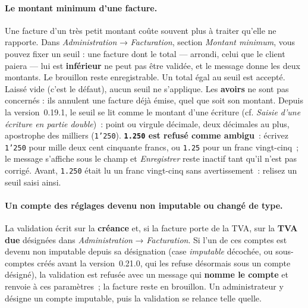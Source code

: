 \documentclass[a4paper,11pt,oneside]{article}
\begin{document}
\paragraph{Le montant minimum d'une facture.} Une facture d'un très petit montant coûte souvent plus à traiter qu'elle ne rapporte. Dans \emph{Administration} → \emph{Facturation}, section \emph{Montant minimum}, vous pouvez fixer un seuil : une facture dont le total --- arrondi, celui que le client paiera --- lui est \textbf{inférieur} ne peut pas être validée, et le message donne les deux montants. Le brouillon reste enregistrable. Un total égal au seuil est accepté. Laissé vide (c'est le défaut), aucun seuil ne s'applique. Les \textbf{avoirs} ne sont pas concernés : ils annulent une facture déjà émise, quel que soit son montant. Depuis la version~0.19.1, le seuil se lit comme le montant d'une écriture (cf. \emph{Saisie d'une écriture en partie double})~: point ou virgule décimale, deux décimales au plus, apostrophe des milliers (\texttt{1'250}). \textbf{\texttt{1.250} est refusé comme ambigu}~: écrivez \texttt{1'250} pour mille deux cent cinquante francs, ou \texttt{1.25} pour un franc vingt-cinq~; le message s'affiche sous le champ et \emph{Enregistrer} reste inactif tant qu'il n'est pas corrigé. Avant, \texttt{1.250} était lu un franc vingt-cinq sans avertissement~: relisez un seuil saisi ainsi.

\paragraph{Un compte des réglages devenu non imputable ou changé de type.} La validation écrit sur la \textbf{créance} et, si la facture porte de la TVA, sur la \textbf{TVA due} désignées dans \emph{Administration} → \emph{Facturation}. Si l'un de ces comptes est devenu non imputable depuis sa désignation (case \emph{imputable} décochée, ou sous-comptes créés avant la version~0.21.0, qui les refuse désormais sous un compte désigné), la validation est refusée avec un message qui \textbf{nomme le compte} et renvoie à ces paramètres~; la facture reste en brouillon. Un administrateur y désigne un compte imputable, puis la validation se relance telle quelle.
\end{document}
